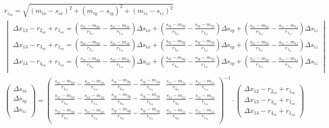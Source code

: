 \begin{gather*}
    r_{i_{ca}} = \sqrt{(m_{ix} - s_{ix})^2 + (m_{iy} - s_{iy})^2 + (m_{iz} - s_{iz})^2}\\
    \begin{vmatrix}
        \Delta{x_{12}} - r_{2_{ca}} + r_{1_{ca}} = \left(\frac{s_{ix} - m_{2x}}{r_{2_{ca}}} - \frac{s_{ix} - m_{1x}}{r_{1_{ca}}} \right) \Delta{s}_{ix} + \left(\frac{s_{iy} - m_{2y}}{r_{2_{ca}}} - \frac{s_{iy} - m_{1y}}{r_{1_{ca}}} \right)  \Delta{s}_{iy} + \left(\frac{s_{iz} - m_{2z}}{r_{2_{ca}}} - \frac{s_{iz} - m_{1z}}{r_{1_{ca}}} \right)  \Delta{s}_{iz} \\
        \Delta{x_{13}} - r_{3_{ca}} + r_{1_{ca}} = \left(\frac{s_{ix} - m_{3x}}{r_{3_{ca}}} - \frac{s_{ix} - m_{1x}}{r_{1_{ca}}} \right) \Delta{s}_{ix} + \left(\frac{s_{iy} - m_{3y}}{r_{3_{ca}}} - \frac{s_{iy} - m_{1y}}{r_{1_{ca}}} \right)  \Delta{s}_{iy} + \left(\frac{s_{iz} - m_{3z}}{r_{3_{ca}}} - \frac{s_{iz} - m_{1z}}{r_{1_{ca}}} \right)  \Delta{s}_{iz} \\
        \Delta{x_{14}} - r_{4_{ca}} + r_{1_{ca}} = \left(\frac{s_{ix} - m_{4x}}{r_{4_{ca}}} - \frac{s_{ix} - m_{1x}}{r_{1_{ca}}} \right) \Delta{s}_{ix} + \left(\frac{s_{iy} - m_{4y}}{r_{4_{ca}}} - \frac{s_{iy} - m_{1y}}{r_{1_{ca}}} \right)  \Delta{s}_{iy} + \left(\frac{s_{iz} - m_{4z}}{r_{4_{ca}}} - \frac{s_{iz} - m_{1z}}{r_{1_{ca}}} \right)  \Delta{s}_{iz} \\
    \end{vmatrix}\\
    \begin{pmatrix}
        {\Delta{s}}_{ix} \\
        {\Delta{s}}_{iy} \\
        {\Delta{s}}_{iz} \\
    \end{pmatrix}
    =
    {\begin{pmatrix}
          \frac{s_{ix} - m_{2x}}{r_{2_{ca}}} - \frac{s_{ix} - m_{1x}}{r_{1_{ca}}} & \frac{s_{iy} - m_{2y}}{r_{2_{ca}}} - \frac{s_{iy} - m_{1y}}{r_{1_{ca}}} & \frac{s_{iz} - m_{1z}}{r_{2_{ca}}} - \frac{s_{iz} - m_{1z}}{r_{1_{ca}}} \\
          \frac{s_{ix} - m_{3x}}{r_{3_{ca}}} - \frac{s_{ix} - m_{1x}}{r_{1_{ca}}} & \frac{s_{iy} - m_{3y}}{r_{3_{ca}}} - \frac{s_{iy} - m_{1y}}{r_{1_{ca}}} & \frac{s_{iz} - m_{1z}}{r_{3_{ca}}} - \frac{s_{iz} - m_{1z}}{r_{1_{ca}}} \\
          \frac{s_{ix} - m_{4x}}{r_{4_{ca}}} - \frac{s_{ix} - m_{1x}}{r_{1_{ca}}} & \frac{s_{iy} - m_{4y}}{r_{4_{ca}}} - \frac{s_{iy} - m_{1y}}{r_{1_{ca}}} & \frac{s_{iz} - m_{1z}}{r_{4_{ca}}} - \frac{s_{iz} - m_{1z}}{r_{1_{ca}}} \\
      \end{pmatrix}}^{-1}
    \cdot
    \begin{pmatrix}
        \Delta{x_{12}} - r_{2_{ca}} + r_{1_{ca}}\\
        \Delta{x_{13}} - r_{3_{ca}} + r_{1_{ca}}\\
        \Delta{x_{14}} - r_{4_{ca}} + r_{1_{ca}}
    \end{pmatrix}
\end{gather*}

